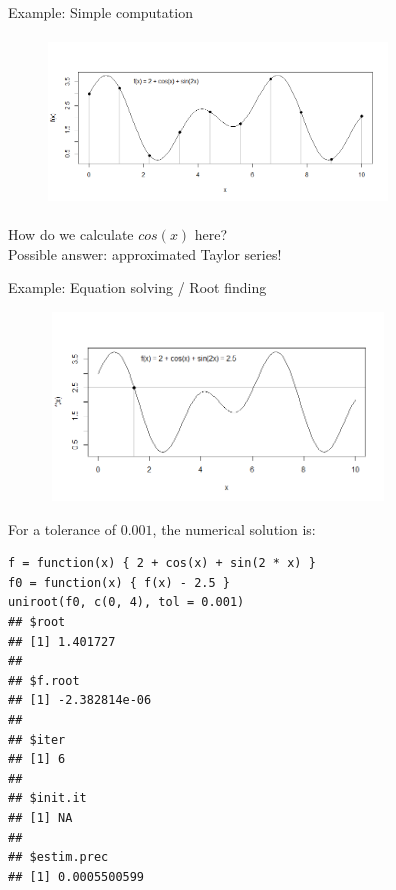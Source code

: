 \documentclass[11pt,compress,t,notes=noshow, xcolor=table]{beamer}
\begin{document}
\begin{vbframe}{Example: Simple computation}

\begin{center}
\begin{figure}
  \includegraphics[height = 4.5cm, width = 9cm]{figure_man/simple-comp.png}
\end{figure}
\end{center}

How do we calculate $cos(x)$ here?\\
Possible answer: approximated Taylor series!

\end{vbframe}

\begin{vbframe}{Example: Equation solving / Root finding}

\begin{center}
\begin{figure}
  \includegraphics[height = 5cm, width = 9cm]{figure_man/Equation-solving.png}
\end{figure}
\end{center}

\framebreak

For a tolerance of $0.001$, the numerical solution is:

\lz
\footnotesize
\begin{verbatim}
f = function(x) { 2 + cos(x) + sin(2 * x) }
f0 = function(x) { f(x) - 2.5 }
uniroot(f0, c(0, 4), tol = 0.001)
## $root
## [1] 1.401727
##
## $f.root
## [1] -2.382814e-06
##
## $iter
## [1] 6
##
## $init.it
## [1] NA
##
## $estim.prec
## [1] 0.0005500599
\end{verbatim}


\end{vbframe}
\end{document}
